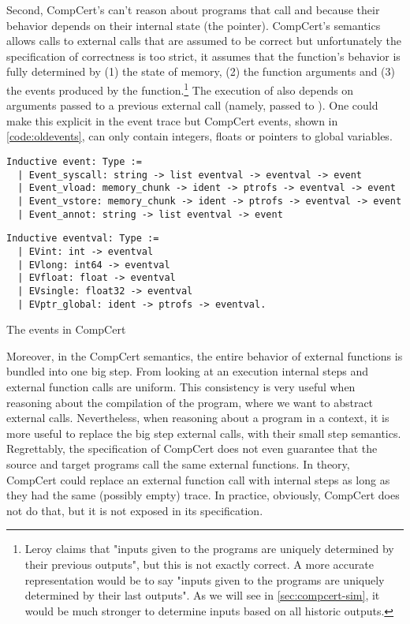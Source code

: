 Second, CompCert's can't reason about programs that call  and  because their behavior depends on their internal state (the  pointer). CompCert's semantics allows calls to external calls that are assumed to be correct but unfortunately the specification of correctness is too strict, it assumes that the function's behavior is fully determined by (1) the state of memory, (2) the function arguments and (3) the events produced by the function.\footnote{Leroy \cite{Leroy-Compcert-CACM} claims that "inputs given to the programs are uniquely determined by their previous outputs", but this is not exactly correct. A more accurate representation would be to say "inputs given to the programs are uniquely determined by their last outputs". As we will see in \ref{sec:compcert-sim}, it would be much stronger to determine inputs based on all historic outputs.} The execution of  also depends on arguments passed to a previous external call (namely,  passed to ). One could make this explicit in the event trace but CompCert events, shown in \ref{code:oldevents}, can only contain integers, floats or pointers to global variables.
 
\begin{table}\centering
\begin{multicols}{2}
\begin{lstlisting}[style=CoqTheorem-list]
Inductive event: Type :=
  | Event_syscall: string -> list eventval -> eventval -> event
  | Event_vload: memory_chunk -> ident -> ptrofs -> eventval -> event
  | Event_vstore: memory_chunk -> ident -> ptrofs -> eventval -> event
  | Event_annot: string -> list eventval -> event
  \end{lstlisting}
  
  \begin{lstlisting}
Inductive eventval: Type :=
  | EVint: int -> eventval
  | EVlong: int64 -> eventval
  | EVfloat: float -> eventval
  | EVsingle: float32 -> eventval
  | EVptr_global: ident -> ptrofs -> eventval.
  \end{lstlisting}
\end{multicols}
\caption{The events in CompCert}\label{code:oldevents}
\end{table}

Moreover, in the CompCert semantics, the entire behavior of external functions is bundled into one big step. From looking at an execution internal steps and external function calls are uniform. This consistency is very useful when reasoning about the compilation of the program, where we want to abstract external calls. Nevertheless, when reasoning about a program in a context, it is more useful to replace the big step external calls, with their small step semantics. Regrettably, the specification of CompCert does not even guarantee that the source and target programs call the same external functions. In theory, CompCert could replace an external function call with internal steps as long as they had the same (possibly empty) trace. In practice, obviously, CompCert does not do that, but it is not exposed in its specification.

